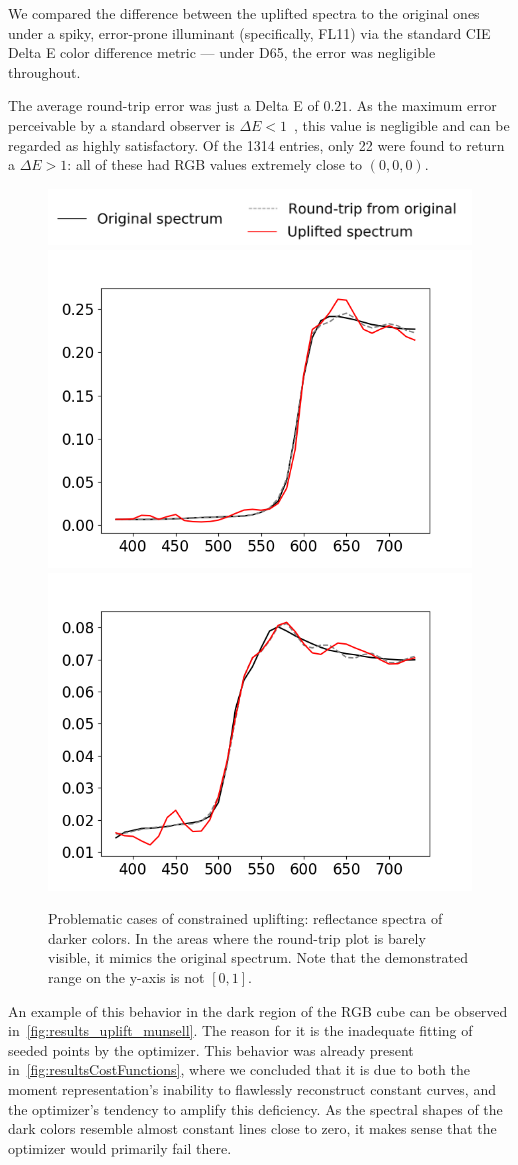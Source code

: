 We compared the difference between the uplifted spectra to the original ones under a spiky, error-prone illuminant (specifically, FL11) via the standard CIE Delta E color difference metric --- under D65, the error was negligible throughout.

The average round-trip error was just a Delta E of $0.21$. As the maximum error perceivable by a standard observer is $\Delta E<1$~\cite{maxColorDifference}, this value is negligible and can be regarded as highly satisfactory. Of the 1314 entries, only 22 were found to return a $\Delta E > 1$: all of these had RGB values extremely close to $(0,0,0)$. 

\begin{figure}[t!]
	\centering
	\includegraphics[width=0.6\linewidth]{img/seeding_accuracy_legend.png}
	\includegraphics[width=0.45\linewidth]{img/seeding_accuracy_dark_12coef.png}
	\includegraphics[width=0.45\linewidth]{img/seeding_accuracy_dark_14coef.png}
	\caption{Problematic cases of constrained uplifting: reflectance spectra of darker colors. In the areas where the round-trip plot is barely visible, it mimics the original spectrum. Note that the demonstrated range on the y-axis is not $[0,1]$.}
	\label{fig:seeding_accuracy_dark}
\end{figure}

An example of this behavior in the dark region of the RGB cube can be observed in~\cref{fig:results_uplift_munsell}. The reason for it is the inadequate fitting of seeded points by the optimizer. This behavior was already present in~\cref{fig:resultsCostFunctions}, where we concluded that it is due to both the moment representation's inability to flawlessly reconstruct constant curves, and the optimizer's tendency to amplify this deficiency. As the spectral shapes of the dark colors resemble almost constant lines close to zero, it makes sense that the optimizer would primarily fail there.


